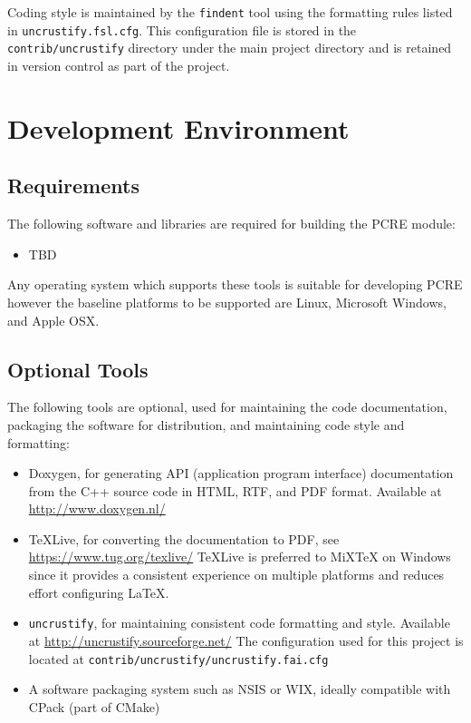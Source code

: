 Coding style is maintained by the \texttt{findent} tool using the formatting rules listed in \texttt{uncrustify.fsl.cfg}. This configuration file is stored in the \texttt{contrib/uncrustify} directory under the main project directory and is retained in version control as part of the project.

\chapter{Development Environment}

\section{Requirements}
The following software and libraries are required for building the PCRE module:

\begin{itemize}
\item TBD
\end{itemize}

Any operating system which supports these tools is suitable for developing PCRE however the baseline platforms to be supported are Linux, Microsoft Windows, and Apple OSX.

\section{Optional Tools}
The following tools are optional, used for maintaining the code documentation, packaging the software for distribution, and maintaining code style and formatting:

\begin{itemize}
\item Doxygen, for generating API (application program interface) documentation from the C++ source code in HTML, RTF, and PDF format. Available at \url{http://www.doxygen.nl/}
\item TeXLive, for converting the documentation to PDF, see \url{https://www.tug.org/texlive/} TeXLive is preferred to MiXTeX on Windows since it provides a consistent experience on multiple platforms and reduces effort configuring LaTeX. 
\item \texttt{uncrustify}, for maintaining consistent code formatting and style. Available at \url{http://uncrustify.sourceforge.net/} The configuration used for this project is located at \texttt{contrib/uncrustify/uncrustify.fai.cfg}
\item A software packaging system such as NSIS or WIX, ideally compatible with CPack (part of CMake)
\end{itemize}


